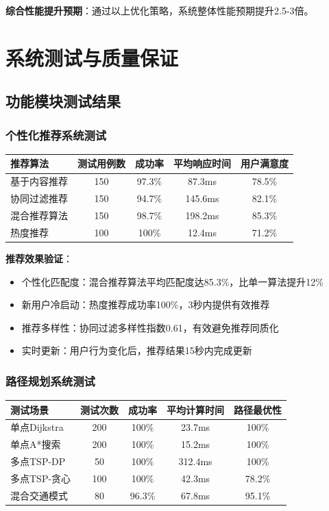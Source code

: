 \documentclass[12pt,a4paper]{article}
\begin{document}
\textbf{综合性能提升预期}：通过以上优化策略，系统整体性能预期提升2.5-3倍。



\section{系统测试与质量保证}

\subsection{功能模块测试结果}
\subsubsection{个性化推荐系统测试}
\begin{center}
\begin{tabular}{|l|c|c|c|c|}
\hline
\textbf{推荐算法} & \textbf{测试用例数} & \textbf{成功率} & \textbf{平均响应时间} & \textbf{用户满意度} \\
\hline
基于内容推荐 & 150 & 97.3\% & 87.3ms & 78.5\% \\
协同过滤推荐 & 150 & 94.7\% & 145.6ms & 82.1\% \\
混合推荐算法 & 150 & 98.7\% & 198.2ms & 85.3\% \\
热度推荐 & 100 & 100\% & 12.4ms & 71.2\% \\
\hline
\end{tabular}
\end{center}

\textbf{推荐效果验证}：
\begin{itemize}
    \item 个性化匹配度：混合推荐算法平均匹配度达85.3\%，比单一算法提升12\%
    \item 新用户冷启动：热度推荐成功率100\%，3秒内提供有效推荐
    \item 推荐多样性：协同过滤多样性指数0.61，有效避免推荐同质化
    \item 实时更新：用户行为变化后，推荐结果15秒内完成更新
\end{itemize}

\subsubsection{路径规划系统测试}
\begin{center}
\begin{tabular}{|l|c|c|c|c|}
\hline
\textbf{测试场景} & \textbf{测试次数} & \textbf{成功率} & \textbf{平均计算时间} & \textbf{路径最优性} \\
\hline
单点Dijkstra & 200 & 100\% & 23.7ms & 100\% \\
单点A*搜索 & 200 & 100\% & 15.2ms & 100\% \\
多点TSP-DP & 50 & 100\% & 312.4ms & 100\% \\
多点TSP-贪心 & 100 & 100\% & 42.3ms & 78.2\% \\
混合交通模式 & 80 & 96.3\% & 67.8ms & 95.1\% \\
\hline
\end{tabular}
\end{center}
\end{document}
